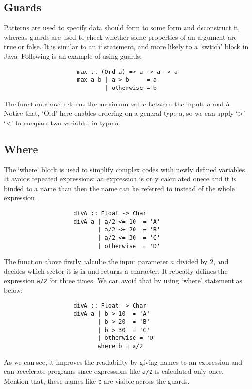 \subsection{Guards}

Patterns are used to specify data should form to some form and deconstruct it, whereas guards are used to check whether some properties of an argument are true or false. It is similar to an if statement, and more likely to a `swtich' block in Java. Following is an example of using guards:
\begin{verbatim}
                     max :: (Ord a) => a -> a -> a
                     max a b | a > b     = a
                             | otherwise = b
\end{verbatim}
The function above returns the maximum value between the inputs $a$ and $b$. Notice that, `Ord' here enables ordering on a general type a, so we can apply `>' `<' to compare two variables in type a.

\subsection{Where}

The `where' block is used to simplify complex codes with newly defined variables. It avoids repeated expressions: an expression is only calculated onece and it is binded to a name than then the name can be referred to instead of the whole expression. 

\begin{verbatim}
                    divA :: Float -> Char
                    divA a | a/2 <= 10  = 'A' 
                           | a/2 <= 20  = 'B'
                           | a/2 <= 30  = 'C'
                           | otherwise  = 'D'
\end{verbatim}

The function above firstly calculte the input parameter $a$ divided by 2, and decides which sector it is in and returns a character. It repeatly defines the expression \verb|a/2| for three times. We can avoid that by using `where' statement as below: 
\begin{verbatim}
                    divA :: Float -> Char
                    divA a | b > 10  = 'A' 
                           | b > 20  = 'B'
                           | b > 30  = 'C'
                           | otherwise = 'D'
                           where b = a/2
\end{verbatim}

As we can see, it improves the readability by giving names to an expression and can accelerate programs since expressions like \verb|a/2| is calculated only once. Mention that, these names like \verb|b| are visible across the guards. 

